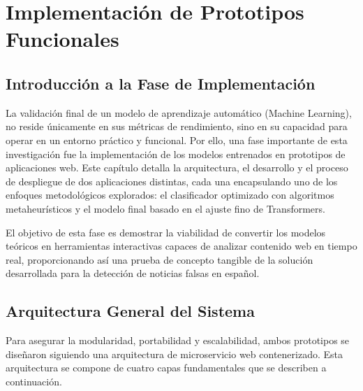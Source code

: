 \chapter{Implementación de Prototipos Funcionales}
\label{chap:implementacion}

\section{Introducción a la Fase de Implementación}
La validación final de un modelo de aprendizaje automático (Machine Learning), no reside únicamente en sus métricas de rendimiento, sino en su capacidad para operar en un entorno práctico y funcional. Por ello, una fase importante de esta investigación fue la implementación de los modelos entrenados en prototipos de aplicaciones web. Este capítulo detalla la arquitectura, el desarrollo y el proceso de despliegue de dos aplicaciones distintas, cada una encapsulando uno de los enfoques metodológicos explorados: el clasificador optimizado con algoritmos metaheurísticos y el modelo final basado en el ajuste fino de Transformers.

El objetivo de esta fase es demostrar la viabilidad de convertir los modelos teóricos en herramientas interactivas capaces de analizar contenido web en tiempo real, proporcionando así una prueba de concepto tangible de la solución desarrollada para la detección de noticias falsas en español.

\section{Arquitectura General del Sistema}
Para asegurar la modularidad, portabilidad y escalabilidad, ambos prototipos se diseñaron siguiendo una arquitectura de microservicio web contenerizado. Esta arquitectura se compone de cuatro capas fundamentales que se describen a continuación.

